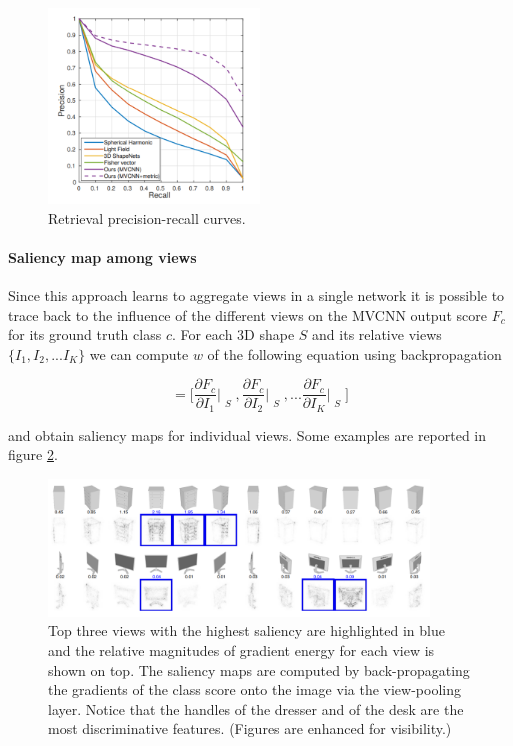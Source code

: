 \begin{figure}[ht]
    \centering
    \includegraphics[width=0.5\textwidth]{images/MVCNN_prec_rec_curve.png}
    \caption{ Retrieval precision-recall curves.}
    \label{fig:MVCNN_prec_rec_curve}
\end{figure}

\paragraph{Saliency map among views}
Since this approach learns to aggregate views in a single network it is possible to trace back to the influence of the different views on the MVCNN output score $F_c$ for its ground truth class $c$. For each 3D shape $S$ and its relative views $\{I_1, I_2, ... I_K\}$ we can compute $w$ of the following equation using backpropagation

\begin{equation}
    [w_1, w_2, ... w_K] = \bigg[
    \frac{\partial F_c}{\partial I_1}\Bigr|_{\substack{S}},
    \frac{\partial F_c}{\partial I_2}\Bigr|_{\substack{S}},
    ... 
    \frac{\partial F_c}{\partial I_K}\Bigr|_{\substack{S}}
    \bigg]
\end{equation}

and obtain saliency maps for individual views. Some examples are reported in figure \ref{fig:MVCNN_saliency}.

\begin{figure}[ht]
    \centering
    \captionsetup{width=.9\linewidth}
    \includegraphics[width=0.9\textwidth]{images/MVCNN_saliency.png}
    \caption{Top three views with the highest saliency are highlighted in blue and the relative magnitudes of gradient energy for each view is
shown on top. The saliency maps are computed by back-propagating the gradients of the class score onto the image via the view-pooling
layer. Notice that the handles of the dresser and of the desk are the most discriminative features. (Figures are enhanced for visibility.)}
    \label{fig:MVCNN_saliency}
\end{figure}



